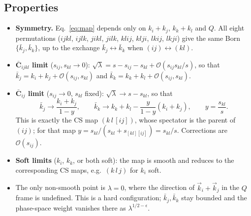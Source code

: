 \documentclass[11pt,a4paper]{article}
\newcommand{\bbC}[1]{\bar{\mathbf C}_{#1}}
\newcommand{\jb}{\bar k_{j}}
\newcommand{\kb}{\bar k_{k}}
\newcommand{\eps}{\epsilon}
\newcommand{\sqL}{\sqrt{\lambda}}
\begin{document}
\subsection{Properties}
\begin{itemize}
\item \textbf{Symmetry.} Eq.~\eqref{eq:map} depends only on $k_i+k_j$, $k_k+k_l$ and $Q$.
All eight permutations ($ijkl$, $ijlk$, $jikl$, $jilk$, $klij$, $klji$, $lkij$, $lkji$) give the
same Born $\{\jb,\kb\}$, up to the exchange $\jb\leftrightarrow\kb$ when $(ij)\leftrightarrow(kl)$.
\item \textbf{$\bbC{ijkl}$ limit} ($s_{ij},s_{kl}\to0$): $\sqL=s-s_{ij}-s_{kl}+\mathcal O(s_{ij}s_{kl}/s)$, so that
$\jb=k_i+k_j+\mathcal O(s_{ij},s_{kl})$ and $\kb=k_k+k_l+\mathcal O(s_{ij},s_{kl})$.
\item \textbf{$\bbC{ij}$ limit} ($s_{ij}\to0$, $s_{kl}$ fixed): $\sqL\to s-s_{kl}$, so that
\begin{equation}
\jb\to\frac{k_i+k_j}{1-y},\qquad \kb\to k_k+k_l-\frac{y}{1-y}(k_i+k_j),\qquad y=\frac{s_{kl}}{s}.
\end{equation}
This is exactly the CS map $(k\,l\,[ij])$, whose spectator is the parent of $(ij)$; for that map
$y=s_{kl}/(s_{kl}+s_{[kl][ij]})=s_{kl}/s$. Corrections are $\mathcal O(s_{ij})$.
\item \textbf{Soft limits} ($k_i$, $k_k$, or both soft): the map is smooth and reduces to the
corresponding CS maps, e.g.\ $(k\,l\,j)$ for $k_i$ soft.
\item The only non-smooth point is $\lambda=0$, where the direction of $\vec k_i+\vec k_j$ in the
$Q$ frame is undefined. This is a hard configuration; $\jb,\kb$ stay bounded and the
phase-space weight vanishes there as $\lambda^{1/2-\eps}$.
\end{itemize}
\end{document}
